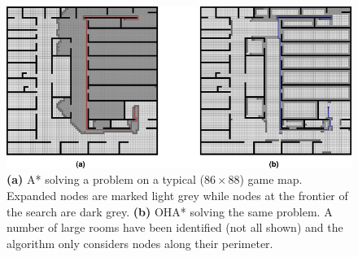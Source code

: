 \begin{figure}[htbp]
	\label{fig-oha_contrast}
	\vspace{-4pt}
       \begin{center}
           \includegraphics[scale=0.50, trim = 10mm 10mm 10mm 0mm]{diagrams/oha_contrast.png}
       \end{center}
	\vspace{-3pt}
       \caption{\textbf{(a)} A* solving a problem on a typical ($86\times88$) game map. 
Expanded nodes are marked light grey while nodes at the frontier of the search are dark grey.
\textbf{(b)} OHA* solving the same problem. A number of large rooms have been identified (not
all shown) and the algorithm only considers nodes along their perimeter.}
       \label{fig-ohacontrast}
	\vspace{-15pt}
\end{figure}



